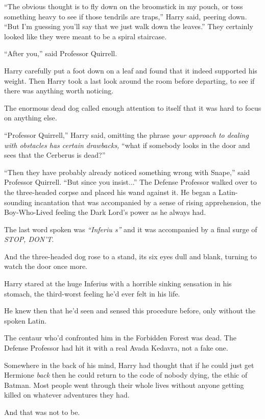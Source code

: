 ``The obvious thought is to fly down on the broomstick in my pouch, or toss something heavy to see if those tendrils are traps,'' Harry said, peering down. ``But I'm guessing you'll say that we just walk down the leaves.'' They certainly looked like they were meant to be a spiral staircase.

``After you,'' said Professor Quirrell.

Harry carefully put a foot down on a leaf and found that it indeed supported his weight. Then Harry took a last look around the room before departing, to see if there was anything worth noticing.

The enormous dead dog called enough attention to itself that it was hard to focus on anything else.

``Professor Quirrell,'' Harry said, omitting the phrase \emph{your approach to dealing with obstacles has certain drawbacks,} ``what if somebody looks in the door and sees that the Cerberus is dead?''

``Then they have probably already noticed something wrong with Snape,'' said Professor Quirrell. ``But since you insist...'' The Defense Professor walked over to the three-headed corpse and placed his wand against it. He began a Latin-sounding incantation that was accompanied by a sense of rising apprehension, the Boy-Who-Lived feeling the Dark Lord's power as he always had.

The last word spoken was \emph{``Inferiu s''} and it was accompanied by a final surge of \emph{STOP, DON'T}.

And the three-headed dog rose to a stand, its six eyes dull and blank, turning to watch the door once more.

Harry stared at the huge Inferius with a horrible sinking sensation in his stomach, the third-worst feeling he'd ever felt in his life.

He knew then that he'd seen and sensed this procedure before, only without the spoken Latin.

The centaur who'd confronted him in the Forbidden Forest was dead. The Defense Professor had hit it with a real Avada Kedavra, not a fake one.

Somewhere in the back of his mind, Harry had thought that if he could just get Hermione \emph{back} then he could return to the code of nobody dying, the ethic of Batman. Most people went through their whole lives without anyone getting killed on whatever adventures they had.

And that was not to be.

